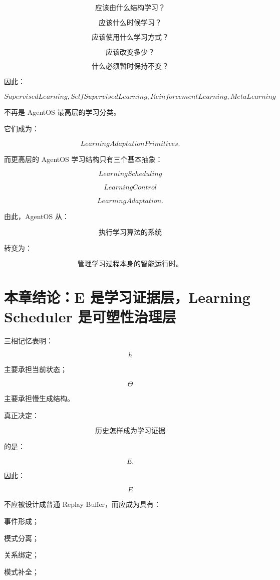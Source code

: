 \[
\boxed{
\text{应该由什么结构学习？}
}
\]

\[
\boxed{
\text{应该什么时候学习？}
}
\]

\[
\boxed{
\text{应该使用什么学习方式？}
}
\]

\[
\boxed{
\text{应该改变多少？}
}
\]

\[
\boxed{
\text{什么必须暂时保持不变？}
}
\]

因此：

\[
\boxed{
SupervisedLearning,
SelfSupervisedLearning,
ReinforcementLearning,
MetaLearning
}
\]

不再是 AgentOS 最高层的学习分类。

它们成为：

\[
\boxed{
LearningAdaptationPrimitives.
}
\]

而更高层的 AgentOS 学习结构只有三个基本抽象：

\[
\boxed{
LearningScheduling
}
\]

\[
\boxed{
LearningControl
}
\]

\[
\boxed{
LearningAdaptation.
}
\]

由此，AgentOS 从：

\[
\boxed{
\text{执行学习算法的系统}
}
\]

转变为：

\[
\boxed{
\textbf{管理学习过程本身的智能运行时。}
}
\]


\section{本章结论：E 是学习证据层，Learning Scheduler 是可塑性治理层}

三相记忆表明：

\[
h
\]

主要承担当前状态；

\[
\Theta
\]

主要承担慢生成结构。

真正决定：

\[
\boxed{
\text{历史怎样成为学习证据}
}
\]

的是：

\[
E.
\]

因此：

\[
\boxed{
E
}
\]

不应被设计成普通 Replay Buffer，而应成为具有：

事件形成；

模式分离；

关系绑定；

模式补全；


